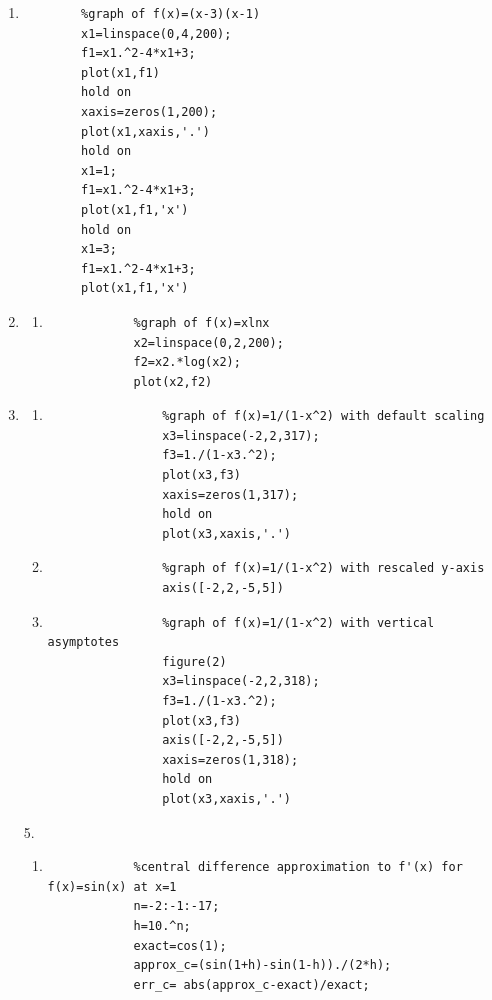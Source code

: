 \documentclass[11pt,a4paper]{article}
\begin{document}
\begin{enumerate}
	\item
	\begin{verbatim}
		%graph of f(x)=(x-3)(x-1)
		x1=linspace(0,4,200);
		f1=x1.^2-4*x1+3;
		plot(x1,f1)
		hold on
		xaxis=zeros(1,200);
		plot(x1,xaxis,'.')
		hold on
		x1=1;
		f1=x1.^2-4*x1+3;
		plot(x1,f1,'x')
		hold on
		x1=3;
		f1=x1.^2-4*x1+3;
		plot(x1,f1,'x')
	\end{verbatim}
	
	\item
	\begin{enumerate}
		\item
		\begin{verbatim}
			%graph of f(x)=xlnx
			x2=linspace(0,2,200);
			f2=x2.*log(x2);
			plot(x2,f2)
		\end{verbatim}
	\end{enumerate}
	
	\item
		\begin{enumerate}
		
			\item
			\begin{verbatim}
				%graph of f(x)=1/(1-x^2) with default scaling
				x3=linspace(-2,2,317);
				f3=1./(1-x3.^2);
				plot(x3,f3)
				xaxis=zeros(1,317);
				hold on
				plot(x3,xaxis,'.')
			\end{verbatim}
			
			\item
			\begin{verbatim}
				%graph of f(x)=1/(1-x^2) with rescaled y-axis
				axis([-2,2,-5,5])
			\end{verbatim}
			
			\item
			\begin{verbatim}
				%graph of f(x)=1/(1-x^2) with vertical asymptotes
				figure(2)
				x3=linspace(-2,2,318);
				f3=1./(1-x3.^2);
				plot(x3,f3)
				axis([-2,2,-5,5])
				xaxis=zeros(1,318);
				hold on
				plot(x3,xaxis,'.')
			\end{verbatim}
			
		\end{enumerate}

\pagebreak
			
	\item[5.]
	\begin{enumerate}
		\item
		\begin{verbatim}
			%central difference approximation to f'(x) for f(x)=sin(x) at x=1
			n=-2:-1:-17;
			h=10.^n;
			exact=cos(1);
			approx_c=(sin(1+h)-sin(1-h))./(2*h);
			err_c= abs(approx_c-exact)/exact;
		\end{verbatim}
		

\end{enumerate}
\end{enumerate}
\end{document}
